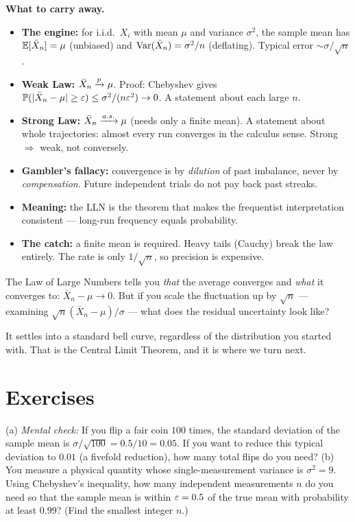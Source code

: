 \begin{focusbox}
\textbf{What to carry away.}
\begin{itemize}
  \item \textbf{The engine:} for i.i.d.\ $X_i$ with mean $\mu$ and variance $\sigma^2$, the sample mean has $\operatorname{\mathbb{E}}[\bar X_n]=\mu$ (unbiased) and $\operatorname{Var}(\bar X_n)=\sigma^2/n$ (deflating). Typical error $\sim \sigma/\sqrt n$.
  \item \textbf{Weak Law:} $\bar X_n \xrightarrow{p} \mu$. Proof: Chebyshev gives $\operatorname{\mathbb{P}}(\lvert\bar X_n-\mu\rvert\ge\varepsilon)\le \sigma^2/(n\varepsilon^2)\to 0$. A statement about each large $n$.
  \item \textbf{Strong Law:} $\bar X_n \xrightarrow{a.s.} \mu$ (needs only a finite mean). A statement about whole trajectories: almost every run converges in the calculus sense. Strong $\Rightarrow$ weak, not conversely.
  \item \textbf{Gambler's fallacy:} convergence is by \emph{dilution} of past imbalance, never by \emph{compensation}. Future independent trials do not pay back past streaks.
  \item \textbf{Meaning:} the LLN is the theorem that makes the frequentist interpretation consistent --- long-run frequency equals probability.
  \item \textbf{The catch:} a finite mean is required. Heavy tails (Cauchy) break the law entirely. The rate is only $1/\sqrt n$, so precision is expensive.
\end{itemize}
\end{focusbox}

The Law of Large Numbers tells you \emph{that} the average converges and \emph{what} it converges to: $\bar X_n - \mu \to 0$. But if you scale the fluctuation up by $\sqrt n$ --- examining $\sqrt n (\bar X_n - \mu) / \sigma$ --- what does the residual uncertainty look like?

It settles into a standard bell curve, regardless of the distribution you started with. That is the Central Limit Theorem, and it is where we turn next.

\section{Exercises}
\label{ch20:exercises}

\begin{exercise}
(a) \emph{Mental check:} If you flip a fair coin $100$ times, the standard deviation of the sample mean is $\sigma/\sqrt{100} = 0.5/10 = 0.05$. If you want to reduce this typical deviation to $0.01$ (a fivefold reduction), how many total flips do you need?
(b) You measure a physical quantity whose single-measurement variance is $\sigma^2 = 9$. Using Chebyshev's inequality, how many independent measurements $n$ do you need so that the sample mean is within $\varepsilon = 0.5$ of the true mean with probability at least $0.99$? (Find the smallest integer $n$.)
\end{exercise}


